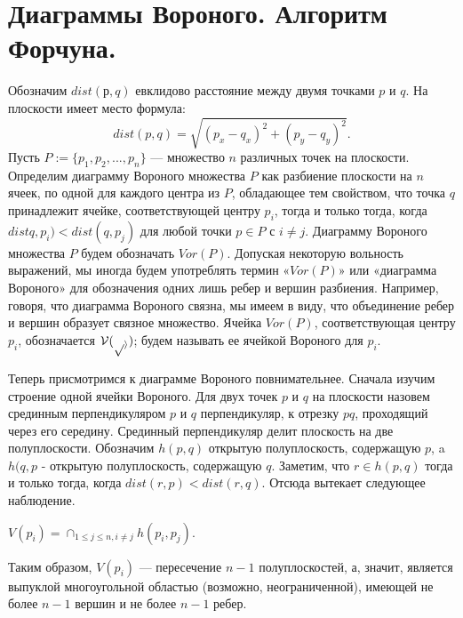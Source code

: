 \section{Диаграммы Вороного. Алгоритм Форчуна. }

\begin{definition}
    Обозначим  $dist(р, q)$  евклидово  расстояние  между  двумя  точками $p$ и $q$.
    На  плоскости имеет место формула: $$dist(p, q) = \sqrt{(p_x-q_x)^2+(p_y-q_y)^2}.$$
    Пусть  $P  := \{p_1,  p_2, ..., p_n\}$  ---  множество  $n$  различных  точек  на  плоскости.
    Определим  диаграмму  Вороного  множества  $P$  как разбиение  плоскости  на  $n$  ячеек,  по  одной  для  каждого  центра  из  $P$,  обладающее тем  свойством,  что  точка  $q$  принадлежит  ячейке,  соответствующей  центру  $p_i$,  тогда и  только  тогда,  когда  $distq, p_i)  <  dist(q,  p_j)$  для  любой  точки  $p \in P$ с $i \not= j$.
    Диаграмму Вороного  множества  $P$  будем  обозначать  $Vor(P)$. 
    Допуская  некоторую  вольность выражений,  мы  иногда  будем  употреблять  термин  «$Vor(P)$»  или  «диаграмма  Вороного»  для  обозначения  одних  лишь  ребер  и  вершин  разбиения.
    Например,  говоря, что  диаграмма  Вороного  связна,  мы  имеем  в  виду,  что  объединение  ребер  и  вершин образует  связное  множество. 
    Ячейка  $Vor(P)$,  соответствующая  центру  $p_i$,  обозначается  $\cal V(p_i)$;  будем  называть  ее  ячейкой  Вороного  для  $p_i$.
\end{definition}

Теперь  присмотримся  к  диаграмме  Вороного  повнимательнее. 
Сначала  изучим строение  одной  ячейки  Вороного. 
Для  двух  точек  $p$  и  $q$  на  плоскости  назовем  срединным  перпендикуляром  $p$  и  $q$  перпендикуляр,  к  отрезку  $pq$,  проходящий  через его  середину. 
Срединный  перпендикуляр  делит  плоскость  на  две  полуплоскости. 
Обозначим  $h(p, q)$  открытую  полуплоскость,  содержащую  $p$,  a  $h(q, p$  -  открытую полуплоскость,  содержащую  $q$. 
Заметим,  что  $r \in h(p, q)$  тогда  и  только  тогда,  когда $dist(r,p)  <  dist(r,  q)$. 
Отсюда  вытекает  следующее  наблюдение.

\begin{observation}
    $V(p_i) = \cap_{1 \le j \le n, i \not= j} h(p_i, p_j)$.
\end{observation}

Таким  образом,  $V(p_i)$  ---  пересечение  $n  -  1$  полуплоскостей, а,  значит,  является  выпуклой  многоугольной  областью  (возможно,  неограниченной),  имеющей  не  более $n - 1$ вершин  и не  более $n - 1$  ребер.

